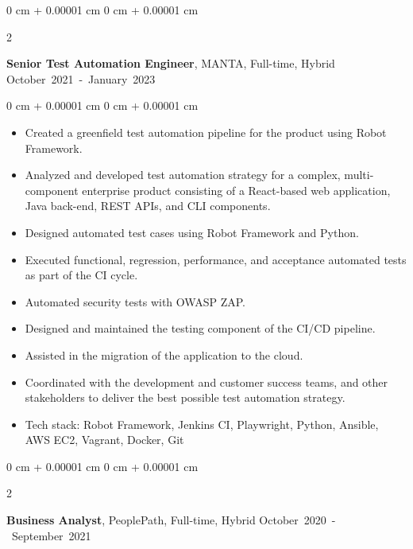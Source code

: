 \documentclass[10pt, a4paper]{article}
\newenvironment{highlights}{
    \begin{itemize}[
        topsep=0.05 cm,
        parsep=0.05 cm,
        partopsep=0pt,
        itemsep=0pt,
        leftmargin=0 cm + 10pt
    ]
}{
    \end{itemize}
} %
\newenvironment{onecolentry}{
    \begin{adjustwidth}{
        0 cm + 0.00001 cm
    }{
        0 cm + 0.00001 cm
    }
}{
    \end{adjustwidth}
} %
\newenvironment{twocolentry}[2][]{
    \onecolentry
    \def\secondColumn{#2}
    \setcolumnwidth{\fill, 4.5 cm}
    \begin{paracol}{2}
}{
    \switchcolumn \raggedleft \secondColumn
    \end{paracol}
    \endonecolentry
} %
\begin{document}
        \vspace{0.5 cm}

        \begin{twocolentry}{
            \small\mbox{October 2021 - January 2023}
        }
            \textbf{Senior Test Automation Engineer}, MANTA, Full-time, Hybrid\end{twocolentry}

        \vspace{0.10 cm}
        \begin{onecolentry}
            \begin{highlights}
                \item Created a greenfield test automation pipeline for the product using Robot Framework.
                \item Analyzed and developed test automation strategy for a complex, multi-component enterprise product consisting of a React-based web application, Java back-end, REST APIs, and CLI components.
                \item Designed automated test cases using Robot Framework and Python.
                \item Executed functional, regression, performance, and acceptance automated tests as part of the CI cycle.
                \item Automated security tests with OWASP ZAP.
                \item Designed and maintained the testing component of the CI/CD pipeline.
                \item Assisted in the migration of the application to the cloud.
                \item Coordinated with the development and customer success teams, and other stakeholders to deliver the best possible test automation strategy.
                \item Tech stack: Robot Framework, Jenkins CI, Playwright, Python, Ansible, AWS EC2, Vagrant, Docker, Git
            \end{highlights}
        \end{onecolentry}

        \vspace{0.5 cm}

        \begin{twocolentry}{
            \small\mbox{October 2020 - September 2021}
        }
            \textbf{Business Analyst}, PeoplePath, Full-time, Hybrid\end{twocolentry}
\end{document}
